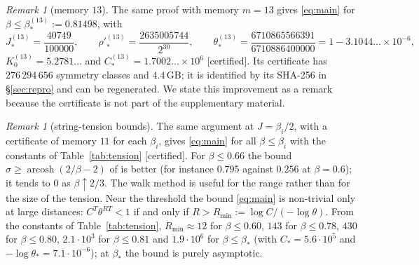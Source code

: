 \documentclass[11pt,a4paper]{article}
\theoremstyle{plain}
\theoremstyle{remark}
\newtheorem{remark}[theorem]{Remark}
\numberwithin{equation}{section}
\newcommand{\st}[1]{\textsf{[#1]}}
\begin{document}
\begin{remark}[memory $13$]\label{rem:m13}
The same proof with memory $m=13$ gives \eqref{eq:main} for $\beta\le\beta_*^{(13)}:=0.81498$, with
\[
J_*^{(13)}=\frac{40749}{100000},\qquad \rho'^{(13)}_*=\frac{2635005744}{2^{30}},\qquad
\theta_*^{(13)}=\frac{6710865566391}{6710886400000}=1-3.1044\ldots\times10^{-6},
\]
$K_0^{(13)}=5.2781\ldots$ and $C_*^{(13)}=1.7002\ldots\times10^{6}$ \st{certified}. Its certificate has $276\,294\,656$ symmetry
classes and $4.4$\,GB; it is identified by its SHA-256 in \S\ref{sec:repro} and can be regenerated. We state this improvement as a
remark because the certificate is not part of the supplementary material.
\end{remark}

\begin{remark}[string-tension bounds]\label{rem:table}
The same argument at $J=\beta_i/2$, with a certificate of memory $11$ for each $\beta_i$, gives \eqref{eq:main} for all
$\beta\le\beta_i$ with the constants of Table~\ref{tab:tension} \st{certified}. For $\beta\le0.66$ the bound
$\sigma\ge\operatorname{arcosh}(2/\beta-2)$ of \cite[Cor.~7.2]{D7} is better (for instance $0.795$ against $0.256$ at $\beta=0.6$); it
tends to $0$ as $\beta\uparrow2/3$. The walk method is useful for the range rather than for the size of the tension.
Near the threshold the bound \eqref{eq:main} is non-trivial only at large distances: $C^T\theta^{RT}<1$ if and only if
$R>R_{\min}:=\log C/(-\log\theta)$. From the constants of Table~\ref{tab:tension}, $R_{\min}\approx12$ for $\beta\le0.60$,
$143$ for $\beta\le0.78$, $430$ for $\beta\le0.80$, $2.1\cdot10^{3}$ for $\beta\le0.81$ and $1.9\cdot10^{6}$ for $\beta\le\beta_*$
(with $C_*=5.6\cdot10^5$ and $-\log\theta_*=7.1\cdot10^{-6}$); at $\beta_*$ the bound is purely asymptotic.
\end{remark}
\end{document}
